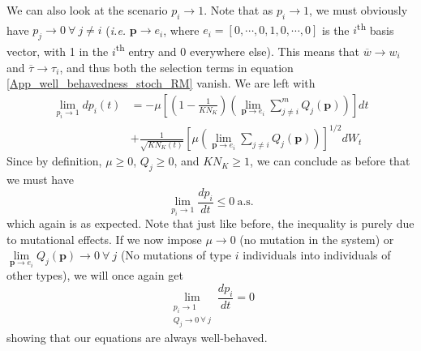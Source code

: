 We can also look at the scenario $p_i \to 1$. Note that as $p_i \to 1$, we must obviously have $p_j \to 0 \ \forall \ j \neq i$ (\emph{i.e.} $\mathbf{p} \to e_i$, where $e_i = [0,\cdots,0,1,0,\cdots,0]$ is the $i$\textsuperscript{th} basis vector, with 1 in the $i$\textsuperscript{th} entry and 0 everywhere else). This means that $\overline{w} \to w_i$ and $\overline{\tau} \to \tau_i$, and thus both the selection terms in equation \eqref{App_well_behavedness_stoch_RM} vanish. We are left with
\begin{equation*}
	\begin{aligned}
		\lim\limits_{p_i \to 1} dp_i(t) &= -\mu\left[\left(1 - \frac{1}{KN_K}\right)\left(\lim\limits_{\mathbf{p} \to e_i}\sum\limits_{j\neq i}^{m}Q_j(\mathbf{p})\right)\right]dt\\[15pt]
		&+ \frac{1}{\sqrt{KN_{K}(t)}}\left[\mu\left(\lim\limits_{\mathbf{p} \to e_i} \sum\limits_{j\neq i}Q_j(\mathbf{p})\right)\right]^{1/2}dW_t
	\end{aligned}
\end{equation*}
Since by definition, $\mu \geq 0$, $Q_j \geq 0$, and  $KN_K \geq 1$, we can conclude as before that we must have
\begin{equation*}
	\lim\limits_{p_i \to 1} \frac{dp_i}{dt} \leq 0 \ \textrm{a.s.}
\end{equation*}
which again is as expected. Note that just like before, the inequality is purely due to mutational effects. If we now impose $\mu \to 0$ (no mutation in the system) or $\lim\limits_{\mathbf{p} \to e_i} Q_j(\mathbf{p}) \to 0 \ \forall \ j$ (No mutations of type $i$ individuals into individuals of other types), we will once again get
\begin{equation*}
	\lim_{\substack{p_i \to 1 \\ Q_j \to 0 \ \forall \ j}} \frac{dp_i}{dt} = 0
\end{equation*}
showing that our equations are always well-behaved.